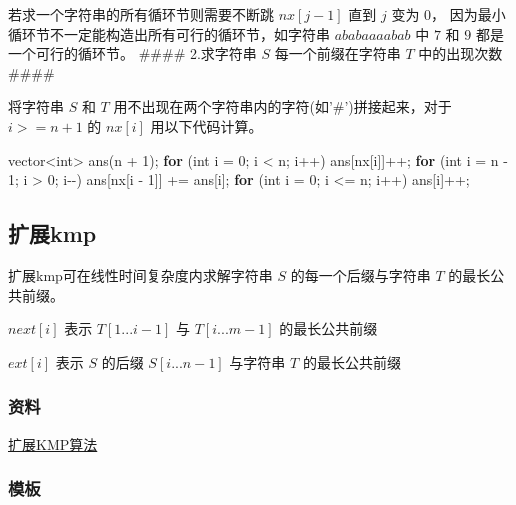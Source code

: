 \documentclass[
]{article}
\newenvironment{Shaded}{}{}
\newcommand{\ControlFlowTok}[1]{\textcolor[rgb]{0.00,0.44,0.13}{\textbf{#1}}}
\newcommand{\DataTypeTok}[1]{\textcolor[rgb]{0.56,0.13,0.00}{#1}}
\newcommand{\DecValTok}[1]{\textcolor[rgb]{0.25,0.63,0.44}{#1}}
\newcommand{\NormalTok}[1]{#1}
\begin{document}
若求一个字符串的所有循环节则需要不断跳 \(nx[j-1]\) 直到 \(j\) 变为
\(0\)， 因为最小循环节不一定能构造出所有可行的循环节，如字符串
\(ababaaaabab\) 中 \(7\) 和 \(9\) 都是一个可行的循环节。 \#\#\#\#
2.求字符串 \(S\) 每一个前缀在字符串 \(T\) 中的出现次数 \#\#\#\#

将字符串 \(S\) 和 \(T\)
用不出现在两个字符串内的字符(如'\#')拼接起来，对于 \(i>=n+1\) 的
\(nx[i]\) 用以下代码计算。

\begin{Shaded}
\begin{Highlighting}[]
\NormalTok{vector\textless{}}\DataTypeTok{int}\NormalTok{\textgreater{} ans(n + }\DecValTok{1}\NormalTok{);}
\ControlFlowTok{for}\NormalTok{ (}\DataTypeTok{int}\NormalTok{ i = }\DecValTok{0}\NormalTok{; i \textless{} n; i++) ans[nx[i]]++;}
\ControlFlowTok{for}\NormalTok{ (}\DataTypeTok{int}\NormalTok{ i = n {-} }\DecValTok{1}\NormalTok{; i \textgreater{} }\DecValTok{0}\NormalTok{; i{-}{-}) ans[nx[i {-} }\DecValTok{1}\NormalTok{]] += ans[i];}
\ControlFlowTok{for}\NormalTok{ (}\DataTypeTok{int}\NormalTok{ i = }\DecValTok{0}\NormalTok{; i \textless{}= n; i++) ans[i]++;}
\end{Highlighting}
\end{Shaded}

\hypertarget{ux6269ux5c55kmp}{%
\subsection{扩展kmp}\label{ux6269ux5c55kmp}}

扩展kmp可在线性时间复杂度内求解字符串 \(S\) 的每一个后缀与字符串 \(T\)
的最长公共前缀。

\(next[i]\) 表示 \(T[1...i-1]\) 与 \(T[i...m-1]\) 的最长公共前缀

\(ext[i]\) 表示 \(S\) 的后缀 \(S[i...n-1]\) 与字符串 \(T\)
的最长公共前缀

\hypertarget{ux8d44ux6599-3}{%
\subsubsection{资料}\label{ux8d44ux6599-3}}

\href{https://segmentfault.com/a/1190000008663857}{扩展KMP算法}

\hypertarget{ux6a21ux677f-4}{%
\subsubsection{模板}\label{ux6a21ux677f-4}}
\end{document}
